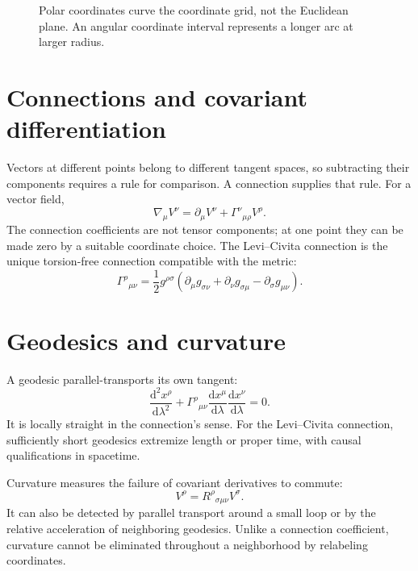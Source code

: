\documentclass[11pt,oneside]{book}
\newcommand{\dd}{\mathrm{d}}
\theoremstyle{reviewstyle}
\begin{document}
\begin{figure}[ht]
\centering
{}
\caption{Polar coordinates curve the coordinate grid, not the Euclidean plane. An angular coordinate interval represents a longer arc at larger radius.}
\end{figure}

\section{Connections and covariant differentiation}
Vectors at different points belong to different tangent spaces, so subtracting their components requires a rule for comparison. A connection supplies that rule. For a vector field,
\begin{equation}
\nabla_\mu V^\nu=\partial_\mu V^\nu+\Gamma^\nu{}_{\mu\rho}V^\rho.
\end{equation}
The connection coefficients are not tensor components; at one point they can be made zero by a suitable coordinate choice. The Levi--Civita connection is the unique torsion-free connection compatible with the metric:
\begin{equation}
\Gamma^\rho{}_{\mu\nu}=\frac12g^{\rho\sigma}
(\partial_\mu g_{\sigma\nu}+\partial_\nu g_{\sigma\mu}-\partial_\sigma g_{\mu\nu}).
\end{equation}

\section{Geodesics and curvature}
A geodesic parallel-transports its own tangent:
\begin{equation}
\frac{\dd^2x^\rho}{\dd\lambda^2}+\Gamma^\rho{}_{\mu\nu}
\frac{\dd x^\mu}{\dd\lambda}\frac{\dd x^\nu}{\dd\lambda}=0.
\end{equation}
It is locally straight in the connection's sense. For the Levi--Civita connection, sufficiently short geodesics extremize length or proper time, with causal qualifications in spacetime.

Curvature measures the failure of covariant derivatives to commute:
\begin{equation}
[\nabla_\mu,\nabla_\nu]V^\rho=R^\rho{}_{\sigma\mu\nu}V^\sigma.
\end{equation}
It can also be detected by parallel transport around a small loop or by the relative acceleration of neighboring geodesics. Unlike a connection coefficient, curvature cannot be eliminated throughout a neighborhood by relabeling coordinates.
\end{document}

